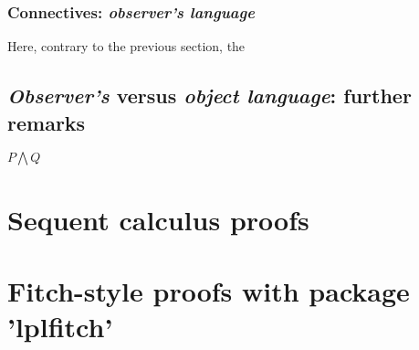 \documentclass[12pt]{article}
\begin{document}
\subsubsection{Connectives: \textit{observer's language}}
Here, contrary to the previous section, the 
\subsection{\textit{Observer's} versus \textit{object language}: further remarks}
$ P \bigwedge Q$
\section{Sequent calculus proofs}

\section{Fitch-style proofs with package 'lplfitch'}
\end{document}

